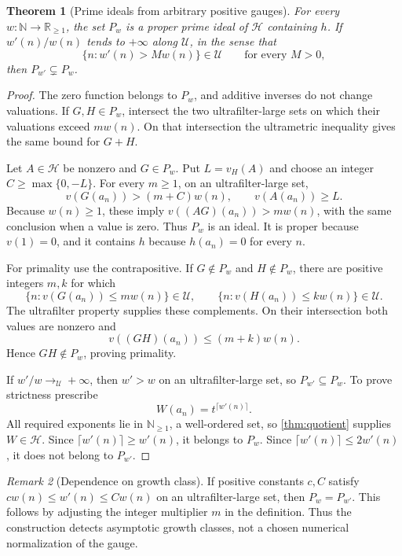 \documentclass[11pt,letterpaper]{article}
\numberwithin{equation}{section}
\newtheorem{theorem}{Theorem}[section]
\theoremstyle{definition}
\theoremstyle{remark}
\newtheorem{remark}[theorem]{Remark}
\newcommand{\R}{\mathbb R}
\newcommand{\N}{\mathbb N}
\newcommand{\HH}{\mathcal H}
\newcommand{\UU}{\mathcal U}
\newcommand{\vH}{v_{\!H}}
\begin{document}
\begin{theorem}[Prime ideals from arbitrary positive gauges]
\label{thm:gauge-prime}
For every $w:\N\to\R_{\ge1}$, the set $P_w$ is a proper prime ideal of
$\HH$ containing $h$. If $w'(n)/w(n)$ tends to $+\infty$ along $\UU$,
in the sense that
\[
 \{n:w'(n)>M w(n)\}\in\UU\qquad\text{for every }M>0,
\]
then $P_{w'}\subsetneq P_w$.
\end{theorem}
\begin{proof}
The zero function belongs to $P_w$, and additive inverses do not change
valuations. If $G,H\in P_w$, intersect the two ultrafilter-large sets on
which their valuations exceed $m w(n)$. On that intersection the
ultrametric inequality gives the same bound for $G+H$.

Let $A\in\HH$ be nonzero and $G\in P_w$. Put $L=\vH(A)$ and choose an
integer $C\ge\max\{0,-L\}$. For every $m\ge1$, on an ultrafilter-large
set,
\[
 v(G(a_n))>(m+C)w(n),\qquad v(A(a_n))\ge L.
\]
Because $w(n)\ge1$, these imply $v((AG)(a_n))>m w(n)$, with the same
conclusion when a value is zero. Thus $P_w$ is an ideal. It is proper
because $v(1)=0$, and it contains $h$ because $h(a_n)=0$ for every $n$.

For primality use the contrapositive. If $G\notin P_w$ and $H\notin P_w$,
there are positive integers $m,k$ for which
\[
 \{n:v(G(a_n))\le m w(n)\}\in\UU,\qquad
 \{n:v(H(a_n))\le k w(n)\}\in\UU.
\]
The ultrafilter property supplies these complements. On their
intersection both values are nonzero and
\[
 v((GH)(a_n))\le(m+k)w(n).
\]
Hence $GH\notin P_w$, proving primality.

If $w'/w\to_\UU+\infty$, then $w'>w$ on an ultrafilter-large set, so
$P_{w'}\subseteq P_w$. To prove strictness prescribe
\[
 W(a_n)=t^{\lceil w'(n)\rceil}.
\]
All required exponents lie in $\N_{\ge1}$, a well-ordered set, so
\cref{thm:quotient} supplies $W\in\HH$. Since
$\lceil w'(n)\rceil\ge w'(n)$, it belongs to $P_w$. Since
$\lceil w'(n)\rceil\le2w'(n)$, it does not belong to $P_{w'}$.
\end{proof}

\begin{remark}[Dependence on growth class]
If positive constants $c,C$ satisfy $cw(n)\le w'(n)\le Cw(n)$ on an
ultrafilter-large set, then $P_w=P_{w'}$. This follows by adjusting the
integer multiplier $m$ in the definition. Thus the construction detects
asymptotic growth classes, not a chosen numerical normalization of the
gauge.
\end{remark}
\end{document}
